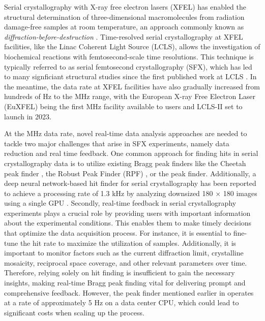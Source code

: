 \documentclass[a4paper]{article}
\begin{document}
Serial crystallography with X-ray free electron lasers (XFEL) has enabled the
structural determination of three-dimensional macromolecules from radiation
damage-free samples at room temperature, an approach commonly known as
\textit{diffraction-before-destruction}
\citep{neutzePotentialBiomolecularImaging2000,
chapmanFemtosecondDiffractiveImaging2006,chapmanFemtosecondXrayProtein2011}.
Time-resolved serial crystallography at XFEL facilities, like the Linac Coherent
Light Source (LCLS), allows the investigation of biochemical reactions with
femtosecond-scale time resolutions.  This technique is typically referred to as
serial femtosecond crystallography (SFX), which has led to many signficiant
structural studies \citep{kupitzSerialTimeresolvedCrystallography2014,
nangoThreedimensionalMovieStructural2016,pandeFemtosecondStructuralDynamics2016a,
youngStructurePhotosystemII2016,sugaLightinducedStructuralChanges2017,
kernStructuresIntermediatesKok2018,ibrahimUntanglingSequenceEvents2020,
sugaTimeresolvedStudiesMetalloproteins2020} since the first published work at
LCLS \citep{aquilaTimeresolvedProteinNanocrystallography2012}.  In the meantime,
the data rate at XFEL facilities have also gradually increased from hundreds of
Hz to the MHz range, with the European X-ray Free Electron Laser (EuXFEL) being
the first MHz facility available to users and LCLS-II set to launch in 2023.  

At the MHz data rate, novel real-time data analysis approaches are needed to
tackle two major challenges that arise in SFX experiments, namely data reduction
and real time feedback.  One common approach for finding hits in serial
crystallography data is to utilize existing Bragg peak finders like the Cheetah
peak finder \citep{bartyCheetahSoftwareHighthroughput2014}, the Robust Peak
Finder (RPF) \citep{hadian-jaziPeakfindingAlgorithmBased2017}, or the \psocake{}
\citep{yoonPsocakeGUIMaking2020} peak finder.  Additionally, a deep neural
network-based hit finder for serial crystallography has been reported to achieve
a processing rate of 1.3 kHz by analyzing downsized 180 $\times$ 180 images
using a single GPU \citep{keConvolutionalNeuralNetworkbased2018}.  Secondly,
real-time feedback in serial crystallography experiments plays a crucial role by
providing users with important information about the experimental conditions.
This enables them to make timely decisions that optimize the data acquisition
process. For instance, it is essential to fine-tune the hit rate to maximize the
utilization of samples. Additionally, it is important to monitor factors such as
the current diffraction limit, crystalline mosaicity, reciprocal space coverage,
and other relevant parameters over time. Therefore, relying solely on hit
finding is insufficient to gain the necessary insights, making real-time Bragg
peak finding vital for delivering prompt and comprehensive feedback. However,
the peak finder mentioned earlier in \psocake{} operates at a rate of
approximately 5 Hz on a data center CPU, which could lead to significant costs
when scaling up the process.
\end{document}
